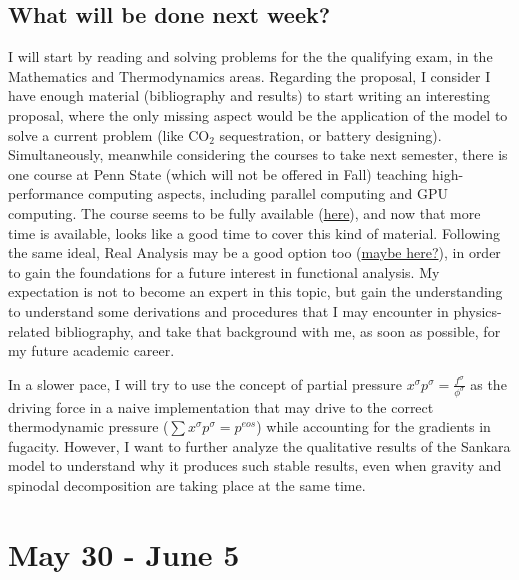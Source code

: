 \documentclass[12pt]{article}
\begin{document}
	\subsection*{What will be done next week?}
	I will start by reading and solving problems for the the qualifying exam, in the Mathematics and Thermodynamics areas. Regarding the proposal, I consider I have enough material (bibliography and results) to start writing an interesting proposal, where the only missing aspect would be the application of the model to solve a current problem (like CO$_2$ sequestration, or battery designing). Simultaneously, meanwhile considering the courses to take next semester, there is one course at Penn State (which will not be offered in Fall) teaching high-performance computing aspects, including parallel computing and GPU computing. The course seems to be fully available (\href{https://psuastro528.github.io/}{here}), and now that more time is available, looks like a good time to cover this kind of material. Following the same ideal, Real Analysis may be a good option too (\href{https://www.youtube.com/playlist?list=PL0E754696F72137EC}{maybe here?}), in order to gain the foundations for a future interest in functional analysis. My expectation is not to become an expert in this topic, but gain the understanding to understand some derivations and procedures that I may encounter in physics-related bibliography, and take that background with me, as soon as possible, for my future academic career. 
	
	In a slower pace, I will try to use the concept of partial pressure $x^\sigma p^\sigma = \frac{f^\sigma}{\phi^\sigma}$ as the driving force in a naive implementation that may drive to the correct thermodynamic pressure ($\sum x^\sigma p^\sigma = p^{eos}$) while accounting for the gradients in fugacity. However, I want to further analyze the qualitative results of the Sankara model to understand why it produces such stable results, even when gravity and spinodal decomposition are taking place at the same time.
	
	\pagebreak
	\section*{May 30 - June 5}
\end{document}
